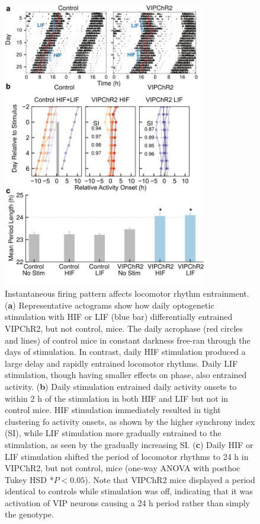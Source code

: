 \clearpage
\begin{figure}[p]
    \begin{center}
        \includegraphics[width=3.5in]{chap5/figures/Figure6.png}
    \end{center}
    \caption{\label{fig:cm6} Instantaneous firing pattern affects locomotor rhythm entrainment.
    (\textbf{a}) Representative actograms show how daily optogenetic stimulation with HIF or LIF (blue bar) differentially entrained VIPChR2, but not control, mice. The daily acrophase (red circles and lines) of control mice in constant darkness free-ran through the days of stimulation. In contrast, daily HIF stimulation produced a large delay and rapidly entrained locomotor rhythms. Daily LIF stimulation, though having smaller effects on phase, also entrained activity.
    (\textbf{b}) Daily stimulation entrained daily activity onsets to within 2 h of the stimulation in both HIF and LIF but not in control mice. HIF stimulation immediately resulted in tight clustering fo activity onsets, as shown by the higher synchrony index (SI), while LIF stimulation more gradually entrained to the stimulation, as seen by the gradually increasing SI. 
    (\textbf{c}) Daily HIF or LIF stimulation shifted the period of locomotor rhythms to 24 h in VIPChR2, but not control, mice (one-way ANOVA with posthoc Tukey HSD *$P < 0.05$). Note that VIPChR2 mice displayed a period identical to controls while stimulation was off, indicating that it was activation of VIP neurons causing a 24 h period rather than simply the genotype.
    }
\end{figure}



